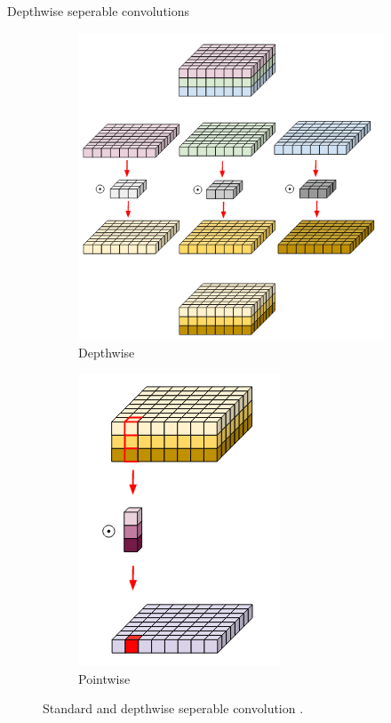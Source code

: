 \documentclass{beamer}
\begin{document}
\begin{frame}{Depthwise seperable convolutions}
\begin{figure}
\begin{subfigure}{.5\textwidth}
			\centering
			\includegraphics[width=0.75\linewidth]{images/depthwise_conv}
			\caption{Depthwise}
		\end{subfigure}
		\begin{subfigure}{.2\textwidth}
			\centering
			\includegraphics[width=.9\linewidth]{images/pointwise_conv}
			\caption{Pointwise}
		\end{subfigure}
		\caption{Standard and depthwise seperable convolution \cite{depthwise}.}
		\label{Fig:depthwise}
	\end{figure}

\end{frame}
\end{document}
